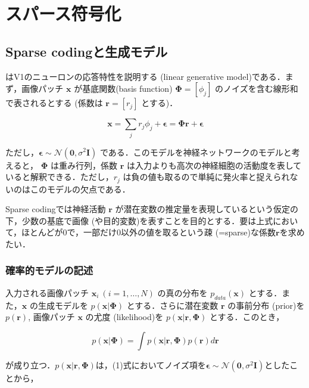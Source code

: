 \section{スパース符号化}
\subsection{Sparse codingと生成モデル}
\textbf{} \cite{Olshausen1996-xe} \cite{Olshausen1997-qu}はV1のニューロンの応答特性を説明する\textbf{} (linear generative model)である．まず，画像パッチ $\mathbf{x}$ が基底関数(basis function) $\mathbf{\Phi} = [\phi_j]$ のノイズを含む線形和で表されるとする (係数は $\mathbf{r}=[r_j]$ とする)．


\begin{equation}
\mathbf{x} = \sum_j r_j \phi_j +\boldsymbol{\epsilon}= \mathbf{\Phi} \mathbf{r}+ \boldsymbol{\epsilon}
\end{equation}


ただし，$\boldsymbol{\epsilon} \sim \mathcal{N}(\mathbf{0}, \sigma^2 \mathbf{I})$ である．このモデルを神経ネットワークのモデルと考えると， $\mathbf{\Phi}$ は重み行列，係数 $\mathbf{r}$ は入力よりも高次の神経細胞の活動度を表していると解釈できる．ただし，$r_j$ は負の値も取るので単純に発火率と捉えられないのはこのモデルの欠点である．

Sparse codingでは神経活動 $\mathbf{r}$ が潜在変数の推定量を表現しているという仮定の下，少数の基底で画像 (や目的変数)を表すことを目的とする．要は上式において，ほとんどが0で，一部だけ0以外の値を取るという疎 (=sparse)な係数$\mathbf{r}$を求めたい．
\subsubsection{確率的モデルの記述}
入力される画像パッチ $\mathbf{x}_i\ (i=1, \ldots, N)$ の真の分布を $p_{data}(\mathbf{x})$ とする．また，$\mathbf{x}$ の生成モデルを $p(\mathbf{x}|\mathbf{\Phi})$ とする．さらに潜在変数 $\mathbf{r}$ の事前分布 (prior)を $p(\mathbf{r})$, 画像パッチ $\mathbf{x}$ の尤度 (likelihood)を $p(\mathbf{x}|\mathbf{r}, \mathbf{\Phi})$ とする．このとき，


\begin{equation}
p(\mathbf{x}|\mathbf{\Phi})=\int p(\mathbf{x}|\mathbf{r}, \mathbf{\Phi})p(\mathbf{r})d\mathbf{r}
\end{equation}


が成り立つ．$p(\mathbf{x}|\mathbf{r}, \mathbf{\Phi})$は，(1)式においてノイズ項を$\boldsymbol{\epsilon} \sim\mathcal{N}(\mathbf{0}, \sigma^2 \mathbf{I})$としたことから，


